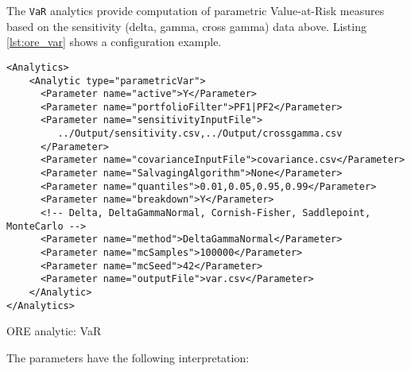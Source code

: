 {The {\tt VaR} analytics provide computation of parametric Value-at-Risk measures based on the sensitivity (delta, gamma, cross gamma) data above. Listing \ref{lst:ore_var} shows a configuration example.

\begin{listing}[H]
\begin{verbatim}
<Analytics>
    <Analytic type="parametricVar"> 
      <Parameter name="active">Y</Parameter> 
      <Parameter name="portfolioFilter">PF1|PF2</Parameter>
      <Parameter name="sensitivityInputFile">
         ../Output/sensitivity.csv,../Output/crossgamma.csv
      </Parameter> 
      <Parameter name="covarianceInputFile">covariance.csv</Parameter> 
      <Parameter name="SalvagingAlgorithm">None</Parameter>
      <Parameter name="quantiles">0.01,0.05,0.95,0.99</Parameter> 
      <Parameter name="breakdown">Y</Parameter> 
      <!-- Delta, DeltaGammaNormal, Cornish-Fisher, Saddlepoint, MonteCarlo -->
      <Parameter name="method">DeltaGammaNormal</Parameter> 
      <Parameter name="mcSamples">100000</Parameter> 
      <Parameter name="mcSeed">42</Parameter> 
      <Parameter name="outputFile">var.csv</Parameter> 
    </Analytic> 
</Analytics>
\end{verbatim}
\caption{ORE analytic: VaR}
\label{lst:ore_var}
\end{listing}

The parameters have the following interpretation:

}
